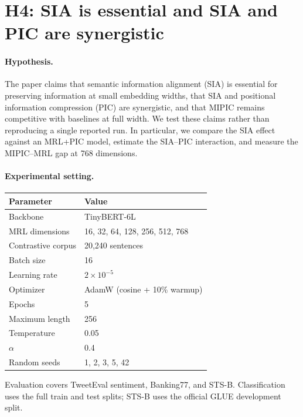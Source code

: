 \section{H4: SIA is essential and SIA and PIC are synergistic}
\label{sec:h4}

\paragraph{Hypothesis.}
The paper \citep{mipic2026} claims that semantic information alignment (SIA) is essential for
preserving information at small embedding widths, that SIA and positional
information compression (PIC) are synergistic, and that MIPIC remains
competitive with baselines at full width.  We test these claims rather than
reproducing a single reported run.  In particular, we compare the SIA effect
against an MRL+PIC model, estimate the SIA--PIC interaction, and measure the
MIPIC--MRL gap at 768 dimensions.

\paragraph{Experimental setting.}
\begin{center}
\small
\setlength{\tabcolsep}{4pt}
\begin{tabular}{@{}ll@{}}
\toprule
\textbf{Parameter} & \textbf{Value} \\
\midrule
Backbone & TinyBERT-6L \citep{jiao-etal-2020-tinybert} \\
MRL dimensions & 16, 32, 64, 128, 256, 512, 768 \\
Contrastive corpus & 20,240 sentences \\
Batch size & 16 \\
Learning rate & $2\times10^{-5}$ \\
Optimizer & AdamW (cosine + 10\% warmup) \\
Epochs & 5 \\
Maximum length & 256 \\
Temperature & 0.05 \\
$\alpha$ & 0.4 \\
Random seeds & 1, 2, 3, 5, 42 \\
\bottomrule
\end{tabular}
\end{center}
Evaluation covers TweetEval sentiment, Banking77, and STS-B.  Classification
uses the full train and test splits; STS-B uses the official GLUE development
split.

